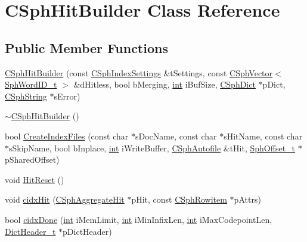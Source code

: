 \hypertarget{classCSphHitBuilder}{\section{C\-Sph\-Hit\-Builder Class Reference}
\label{classCSphHitBuilder}
}
\subsection*{Public Member Functions}
\begin{DoxyCompactItemize}
\item 
\hyperlink{classCSphHitBuilder_a0c2715f92212640ff53720e81d72f9fd}{C\-Sph\-Hit\-Builder} (const \hyperlink{structCSphIndexSettings}{C\-Sph\-Index\-Settings} \&t\-Settings, const \hyperlink{classCSphVector}{C\-Sph\-Vector}$<$ \hyperlink{sphinx_8h_a80a94d5984fdf9214a98f3e5e65df963}{Sph\-Word\-I\-D\-\_\-t} $>$ \&d\-Hitless, bool b\-Merging, \hyperlink{sphinxexpr_8cpp_a4a26e8f9cb8b736e0c4cbf4d16de985e}{int} i\-Buf\-Size, \hyperlink{classCSphDict}{C\-Sph\-Dict} $\ast$p\-Dict, \hyperlink{structCSphString}{C\-Sph\-String} $\ast$s\-Error)
\item 
\hyperlink{classCSphHitBuilder_a959b3116d27917194b32f2d417848d39}{$\sim$\-C\-Sph\-Hit\-Builder} ()
\item 
bool \hyperlink{classCSphHitBuilder_a2c25708d8c2a3d7480784b40fcf6e4af}{Create\-Index\-Files} (const char $\ast$s\-Doc\-Name, const char $\ast$s\-Hit\-Name, const char $\ast$s\-Skip\-Name, bool b\-Inplace, \hyperlink{sphinxexpr_8cpp_a4a26e8f9cb8b736e0c4cbf4d16de985e}{int} i\-Write\-Buffer, \hyperlink{classCSphAutofile}{C\-Sph\-Autofile} \&t\-Hit, \hyperlink{sphinx_8h_a0fb3b64afebef33c61367714754eaa90}{Sph\-Offset\-\_\-t} $\ast$p\-Shared\-Offset)
\item 
void \hyperlink{classCSphHitBuilder_ac71eb4424d38b63c08444cf7dbb14a4c}{Hit\-Reset} ()
\item 
void \hyperlink{classCSphHitBuilder_a3f298afa2c28a0868c7d0c050d538411}{cidx\-Hit} (\hyperlink{structCSphAggregateHit}{C\-Sph\-Aggregate\-Hit} $\ast$p\-Hit, const \hyperlink{sphinx_8h_a6a2df0f05f3397df8b6e230fda6f852f}{C\-Sph\-Rowitem} $\ast$p\-Attrs)
\item 
bool \hyperlink{classCSphHitBuilder_abf105134e87332c234ccd2e216c19e64}{cidx\-Done} (\hyperlink{sphinxexpr_8cpp_a4a26e8f9cb8b736e0c4cbf4d16de985e}{int} i\-Mem\-Limit, \hyperlink{sphinxexpr_8cpp_a4a26e8f9cb8b736e0c4cbf4d16de985e}{int} i\-Min\-Infix\-Len, \hyperlink{sphinxexpr_8cpp_a4a26e8f9cb8b736e0c4cbf4d16de985e}{int} i\-Max\-Codepoint\-Len, \hyperlink{structDictHeader__t}{Dict\-Header\-\_\-t} $\ast$p\-Dict\-Header)

\end{DoxyCompactItemize}
